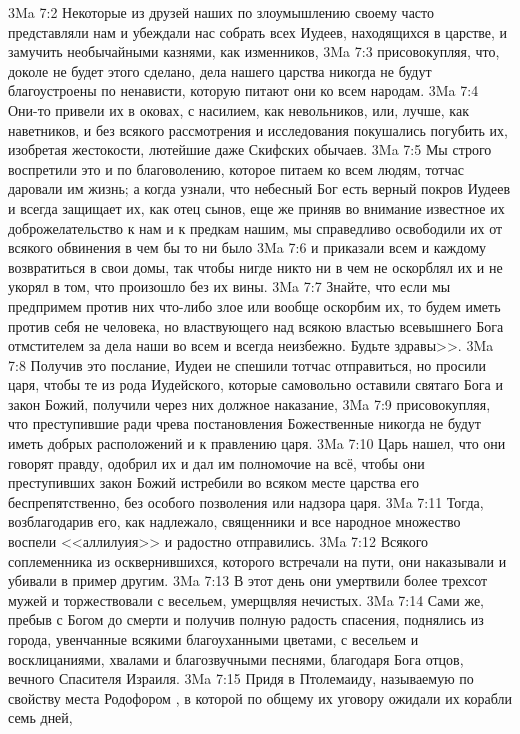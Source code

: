 \vs 3Ma 7:2 Некоторые из друзей наших по злоумышлению своему часто представляли нам и убеждали нас собрать всех Иудеев, находящихся в царстве, и замучить необычайными казнями, как изменников,
\vs 3Ma 7:3 присовокупляя, что, доколе не будет этого сделано, дела нашего царства никогда не будут благоустроены по ненависти, которую питают они ко всем народам.
\vs 3Ma 7:4 Они-то привели их в оковах, с насилием, как невольников, или, лучше, как наветников, и без всякого рассмотрения и исследования покушались погубить их, изобретая жестокости, лютейшие даже Скифских обычаев.
\vs 3Ma 7:5 Мы строго воспретили это и по благоволению, которое питаем ко всем людям, тотчас даровали им жизнь; а когда узнали, что небесный Бог есть верный покров Иудеев и всегда защищает их, как отец сынов, еще же приняв во внимание известное их доброжелательство к нам и к предкам нашим, мы справедливо освободили их от всякого обвинения в чем бы то ни было
\vs 3Ma 7:6 и приказали всем и каждому возвратиться в свои домы, так чтобы нигде никто ни в чем не оскорблял их и не укорял в том, что произошло без их вины.
\vs 3Ma 7:7 Знайте, что если мы предпримем против них что-либо злое или вообще оскорбим их, то будем иметь против себя не человека, но властвующего над всякою властью всевышнего Бога отмстителем за дела наши во всем и всегда неизбежно. Будьте здравы>>.
\rsbpar\vs 3Ma 7:8 Получив это послание, Иудеи не спешили тотчас отправиться, но просили царя, чтобы те из рода Иудейского, которые самовольно оставили святаго Бога и закон Божий, получили через них должное наказание,
\vs 3Ma 7:9 присовокупляя, что преступившие ради чрева постановления Божественные никогда не будут иметь добрых расположений и к правлению царя.
\vs 3Ma 7:10 Царь нашел, что они говорят правду, одобрил их и дал им полномочие на всё, чтобы они преступивших закон Божий истребили во всяком месте царства его беспрепятственно, без особого позволения или надзора царя.
\vs 3Ma 7:11 Тогда, возблагодарив его, как надлежало, священники и все народное множество воспели <<аллилуия>> и радостно отправились.
\vs 3Ma 7:12 Всякого соплеменника из осквернившихся, которого встречали на пути, они наказывали и убивали в пример другим.
\vs 3Ma 7:13 В этот день они умертвили более трехсот мужей и торжествовали с весельем, умерщвляя нечистых.
\vs 3Ma 7:14 Сами же, пребыв с Богом до смерти и получив полную радость спасения, поднялись из города, увенчанные всякими благоуханными цветами, с весельем и восклицаниями, хвалами и благозвучными песнями, благодаря Бога отцов, вечного Спасителя Израиля.
\rsbpar\vs 3Ma 7:15 Придя в Птолемаиду, называемую по свойству места Родофором , в которой по общему их уговору ожидали их корабли семь дней,
